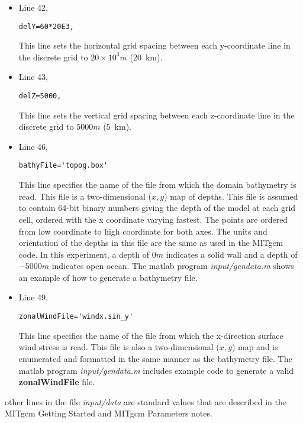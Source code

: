 \begin{itemize}
\item Line 42,
\begin{verbatim}
delY=60*20E3,
\end{verbatim}
This line sets the horizontal grid spacing between each y-coordinate line
in the discrete grid to $20 \times 10^{3}m$ ($20$~km).

\item Line 43,
\begin{verbatim}
delZ=5000,
\end{verbatim}
This line sets the vertical grid spacing between each z-coordinate line
in the discrete grid to $5000m$ ($5$~km).

\item Line 46,
\begin{verbatim}
bathyFile='topog.box'
\end{verbatim}
This line specifies the name of the file from which the domain
bathymetry is read. This file is a two-dimensional ($x,y$) map of
depths. This file is assumed to contain 64-bit binary numbers 
giving the depth of the model at each grid cell, ordered with the x 
coordinate varying fastest. The points are ordered from low coordinate
to high coordinate for both axes. The units and orientation of the
depths in this file are the same as used in the MITgcm code. In this
experiment, a depth of $0m$ indicates a solid wall and a depth
of $-5000m$ indicates open ocean. The matlab program
{\it input/gendata.m} shows an example of how to generate a
bathymetry file.


\item Line 49,
\begin{verbatim}
zonalWindFile='windx.sin_y'
\end{verbatim}
This line specifies the name of the file from which the x-direction
surface wind stress is read. This file is also a two-dimensional
($x,y$) map and is enumerated and formatted in the same manner as the 
bathymetry file. The matlab program {\it input/gendata.m} includes example 
code to generate a valid {\bf zonalWindFile} file.  

\end{itemize}

\noindent other lines in the file {\it input/data} are standard values
that are described in the MITgcm Getting Started and MITgcm Parameters
notes.

\begin{small}

\end{small}

